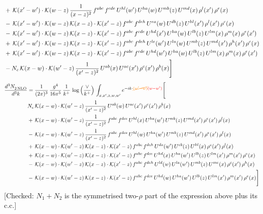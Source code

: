 \documentclass[9pt]{article}
\numberwithin{equation}{section}
\begin{document}
\begin{align}
&+\,\mathcal{K}(x'-w')\cdot\mathcal{K}(w-z)\,\frac{1}{(x-z)^{2}}\,f^{abc}\,f^{cde}\,U^{hl}(w')\,U^{ha}(w)\,U^{mb}(z)\,U^{md}(x)\,\rho^{l}(x')\,\rho^{e}(x)\notag\\
&-\,\mathcal{K}(x'-w')\cdot\mathcal{K}(w-z)\,\mathcal{K}(x-z)\cdot\mathcal{K}(x'-z)\,f^{abc}\,f^{deh}\,U^{ea}(w)\,U^{db}(z)\,U^{hl}(x')\,\rho^{l}(x')\,\rho^{c}(x)\notag\\
&-\,\mathcal{K}(x'-w')\cdot\mathcal{K}(w-z)\,\mathcal{K}(x-z)\cdot\mathcal{K}(x'-z)\,f^{abc}\,f^{cde}\,U^{hd}(x')\,U^{ha}(w)\,U^{lb}(z)\,U^{lm}(x)\,\rho^{m}(x)\,\rho^{e}(x')\notag\\
&+\,\mathcal{K}(x'-w')\cdot\mathcal{K}(w-z)\,\mathcal{K}(x-z)\cdot\mathcal{K}(x'-z)\,f^{abc}\,f^{deh}\,U^{le}(w')\,U^{la}(w)\,U^{mb}(z)\,U^{md}(x')\,\rho^{h}(x')\,\rho^{c}(x)\notag\\
&+\,\mathcal{K}(x'-w')\cdot\mathcal{K}(w-z)\,\mathcal{K}(x-z)\cdot\mathcal{K}(x'-z)\,f^{abc}\,f^{cde}\,U^{hd}(w')\,U^{ha}(w)\,U^{lb}(z)\,U^{lm}(x)\,\rho^{m}(x)\,\rho^{e}(x')\notag\\
&-N_{c}\,\mathcal{K}(x-w)\cdot\mathcal{K}(w'-z)\,\frac{1}{(x'-z)^{2}}\,U^{ab}(x)\,U^{ac}(x')\,\rho^{c}(x')\,\rho^{b}(x)\Bigg]
\end{align}
\begin{align}
\frac{d^{3}N_{2\,\rm NLO}^{\rm}}{d^{3}k}  & = \frac{1}{(2\pi)^{3}}\,\frac{g^{4}}{16\pi^{5}}\,\frac{1}{k^{+}}\,\log{\left(\frac{\vee}{k^{+}}\right)}\, \int_{x,x',z,w,w'}e^{-ik\cdot{\color{orange}\cancel{(w'-w)}}{\color{red}(w-w')}}\Bigg[\notag\\ &    N_{c}\,\mathcal{K}(x-w)\cdot\mathcal{K}(w'-z)\,\frac{1}{(x'-z)^{2}}\,U^{ab}(w)\,U^{ac}(x')\,\rho^{c}(x')\,\rho^{b}(x)\notag\\
&+\,\mathcal{K}(x-w)\cdot\mathcal{K}(w'-z)\,\frac{1}{(x'-z)^{2}}\,f^{abc}\,f^{dce}\,U^{hl}(x)\,U^{ha}(w')\,U^{mb}(z)\,U^{md}(x')\,\rho^{e}(x')\,\rho^{l}(x)\notag\\
&-\,\mathcal{K}(x-w)\cdot\mathcal{K}(w'-z)\,\frac{1}{(x'-z)^{2}}\,f^{abc}\,f^{dce}\,U^{hl}(w)\,U^{ha}(w')\,U^{mb}(z)\,U^{md}(x')\,\rho^{e}(x')\,\rho^{l}(x)\notag\\
&+\,\mathcal{K}(x-w)\cdot\mathcal{K}(w'-z)\,\mathcal{K}(x-z)\cdot\mathcal{K}(x'-z)\,f^{abc}\,f^{deh}\,U^{da}(w')\,U^{eb}(z)\,U^{hl}(x)\,\rho^{c}(x')\,\rho^{l}(x)\notag\\
&+\,\mathcal{K}(x-w)\cdot\mathcal{K}(w'-z)\,\mathcal{K}(x-z)\cdot\mathcal{K}(x'-z)\,f^{abc}\,f^{dce}\,U^{hd}(x)\,U^{ha}(w')\,U^{lb}(z)\,U^{lm}(x')\,\rho^{m}(x')\,\rho^{e}(x)\notag\\
&-\,\mathcal{K}(x-w)\cdot\mathcal{K}(w'-z)\,\mathcal{K}(x-z)\cdot\mathcal{K}(x'-z)\,f^{abc}\,f^{deh}\,U^{ld}(w)\,U^{la}(w')\,U^{mb}(z)\,U^{me}(x)\,\rho^{c}(x')\,\rho^{h}(x)\notag\\
&-\,\mathcal{K}(x-w)\cdot\mathcal{K}(w'-z)\,\mathcal{K}(x-z)\cdot\mathcal{K}(x'-z)\,f^{abc}\,f^{dce}\,U^{hd}(w)\,U^{ha}(w')\,U^{lb}(z)\,U^{lm}(x')\,\rho^{m}(x')\,\rho^{e}(x)\Bigg]
\end{align} {\color{red}[Checked: $N_{1}+N_{2}$ is the symmetrised two-$\rho$ part of the expression above plus its c.c.]}\par\noindent 
\end{document}

